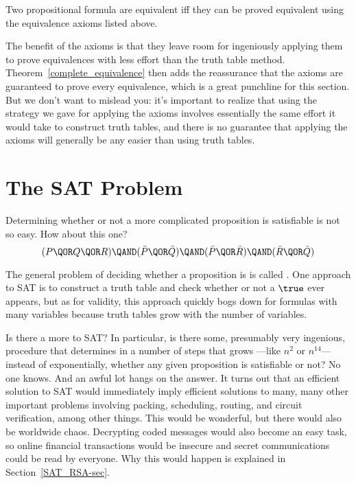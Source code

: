\begin{theorem}
\label{complete_equivalence}
Two propositional formula are equivalent iff they can be proved
equivalent using the equivalence axioms listed above.
\end{theorem}

The benefit of the axioms is that they leave room for ingeniously
applying them to prove equivalences with less effort than the truth
table method.  Theorem~\ref{complete_equivalence} then adds the
reassurance that the axioms are guaranteed to prove every equivalence,
which is a great punchline for this section.  But we don't want to
mislead you: it's important to realize that using the strategy we gave
for applying the axioms involves essentially the same effort it would
take to construct truth tables, and there is no guarantee that applying the
axioms will generally be any easier than using truth tables.

\begin{problems}
\practiceproblems
{}

\classproblems
{}

\homeworkproblems
{}

\end{problems}

\section{The SAT Problem}\label{SAT_sec}
Determining whether or not a more complicated proposition is
satisfiable is not so easy.  How about this one?
%
\[
(P \QOR Q \QOR R) \QAND (\bar P \QOR \bar Q)
                  \QAND (\bar P \QOR \bar R)
                  \QAND (\bar R \QOR \bar Q)
\]

The general problem of deciding whether a proposition is 
is called .  One approach to SAT is to construct a truth table
and check whether or not a $\true$ ever appears, but as for validity, this
approach quickly bogs down for formulas with many variables
because truth tables grow  with the number of
variables.

Is there a more  to SAT?  In particular, is
there some, presumably very ingenious, procedure that determines in a
number of steps that grows \emph{}---like $n^2$ or $n^{14}$---instead of
exponentially, whether any given proposition is satisfiable or not?
No one knows.  And an awful lot hangs on the answer.  It turns out
that an efficient solution to SAT would immediately imply efficient
solutions to many, many other important problems involving packing,
scheduling, routing, and circuit verification, among other things.
This would be wonderful, but there would also be worldwide chaos.
Decrypting coded messages would also become an easy task, so online
financial transactions would be insecure and secret communications
could be read by everyone.  Why this would happen is explained in
Section~\ref{SAT_RSA-sec}.

